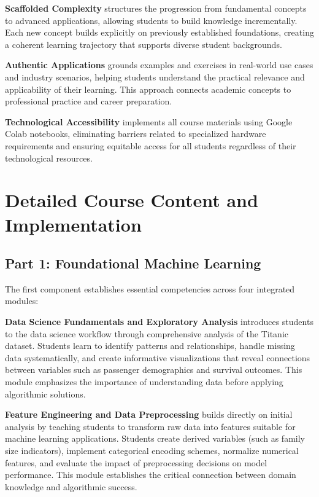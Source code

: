 \documentclass{article}
\begin{document}
\textbf{Scaffolded Complexity} structures the progression from fundamental concepts to advanced applications, allowing students to build knowledge incrementally. Each new concept builds explicitly on previously established foundations, creating a coherent learning trajectory that supports diverse student backgrounds.

\textbf{Authentic Applications} grounds examples and exercises in real-world use cases and industry scenarios, helping students understand the practical relevance and applicability of their learning. This approach connects academic concepts to professional practice and career preparation.

\textbf{Technological Accessibility} implements all course materials using Google Colab notebooks, eliminating barriers related to specialized hardware requirements and ensuring equitable access for all students regardless of their technological resources.

\section{Detailed Course Content and Implementation}

\subsection{Part 1: Foundational Machine Learning}

The first component establishes essential competencies across four integrated modules:

\textbf{Data Science Fundamentals and Exploratory Analysis} introduces students to the data science workflow through comprehensive analysis of the Titanic dataset. Students learn to identify patterns and relationships, handle missing data systematically, and create informative visualizations that reveal connections between variables such as passenger demographics and survival outcomes. This module emphasizes the importance of understanding data before applying algorithmic solutions.

\textbf{Feature Engineering and Data Preprocessing} builds directly on initial analysis by teaching students to transform raw data into features suitable for machine learning applications. Students create derived variables (such as family size indicators), implement categorical encoding schemes, normalize numerical features, and evaluate the impact of preprocessing decisions on model performance. This module establishes the critical connection between domain knowledge and algorithmic success.
\end{document}

